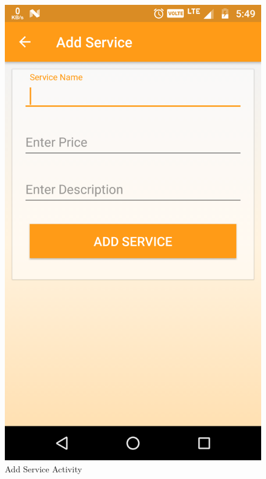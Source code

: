 \\
\begin{figure}[h]
	\centering
	\includegraphics[width=0.7\linewidth]{AddServiceActivity}
	\caption{Add Service Activity}
\end{figure}
\pagebreak

